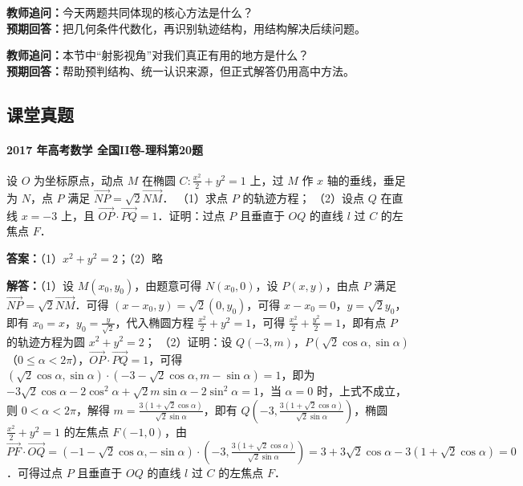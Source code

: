 \documentclass[UTF8,a4paper,11pt]{ctexart}
\begin{document}
\noindent\textbf{教师追问：}今天两题共同体现的核心方法是什么？\\

\textbf{预期回答：}把几何条件代数化，再识别轨迹结构，用结构解决后续问题。\par

\noindent\textbf{教师追问：}本节中“射影视角”对我们真正有用的地方是什么？\\

\textbf{预期回答：}帮助预判结构、统一认识来源，但正式解答仍用高中方法。\par

\subsection*{课堂真题}

\paragraph{2017 年高考数学 全国II卷-理科第20题}

设 $O$ 为坐标原点，动点 $M$ 在椭圆 $C:\frac{x^2}{2}+y^2=1$ 上，过 $M$ 作 $x$ 轴的垂线，垂足为 $N$，点 $P$ 满足 $\overrightarrow{NP}=\sqrt{2}\overrightarrow{NM}$．
（1）求点 $P$ 的轨迹方程；
（2）设点 $Q$ 在直线 $x=-3$ 上，且 $\overrightarrow{OP}\cdot\overrightarrow{PQ}=1$．证明：过点 $P$ 且垂直于 $OQ$ 的直线 $l$ 过 $C$ 的左焦点 $F$．

\textbf{答案：}（1）$x^2+y^2=2$；（2）略\par

\textbf{解答：}（1）设 $M(x_0,y_0)$，由题意可得 $N(x_0,0)$，设 $P(x,y)$，由点 $P$ 满足 $\overrightarrow{NP}=\sqrt{2}\overrightarrow{NM}$．可得 $(x-x_0,y)=\sqrt{2}(0,y_0)$，可得 $x-x_0=0$，$y=\sqrt{2}y_0$，即有 $x_0=x$，$y_0=\frac{y}{\sqrt{2}}$，代入椭圆方程 $\frac{x^2}{2}+y^2=1$，可得 $\frac{x^2}{2}+\frac{y^2}{2}=1$，即有点 $P$ 的轨迹方程为圆 $x^2+y^2=2$；
（2）证明：设 $Q(-3,m)$，$P(\sqrt{2}\cos\alpha,\sin\alpha)$（$0\le\alpha<2\pi$），$\overrightarrow{OP}\cdot\overrightarrow{PQ}=1$，可得 $(\sqrt{2}\cos\alpha,\sin\alpha)\cdot(-3-\sqrt{2}\cos\alpha,m-\sin\alpha)=1$，即为 $-3\sqrt{2}\cos\alpha-2\cos^2\alpha+\sqrt{2}m\sin\alpha-2\sin^2\alpha=1$，当 $\alpha=0$ 时，上式不成立，则 $0<\alpha<2\pi$，解得 $m=\frac{3(1+\sqrt{2}\cos\alpha)}{\sqrt{2}\sin\alpha}$，即有 $Q(-3,\frac{3(1+\sqrt{2}\cos\alpha)}{\sqrt{2}\sin\alpha})$，椭圆 $\frac{x^2}{2}+y^2=1$ 的左焦点 $F(-1,0)$，由 $\overrightarrow{PF}\cdot\overrightarrow{OQ}=(-1-\sqrt{2}\cos\alpha,-\sin\alpha)\cdot(-3,\frac{3(1+\sqrt{2}\cos\alpha)}{\sqrt{2}\sin\alpha})=3+3\sqrt{2}\cos\alpha-3(1+\sqrt{2}\cos\alpha)=0$．可得过点 $P$ 且垂直于 $OQ$ 的直线 $l$ 过 $C$ 的左焦点 $F$．
\end{document}

